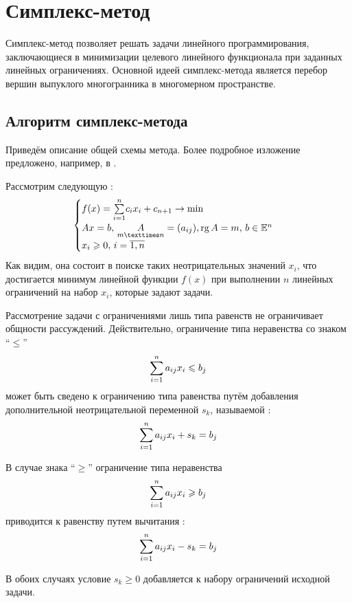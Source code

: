 \section{Симплекс-метод}
\label{sec:simplex}

Симплекс-метод позволяет решать задачи линейного программирования,
заключающиеся в минимизации целевого линейного функционала при
заданных линейных ограничениях. Основной идеей симплекс-метода
является перебор вершин выпуклого многогранника в многомерном
пространстве.

\subsection{Алгоритм симплекс-метода}

Приведём описание общей схемы метода. Более подробное изложение
предложено, например, в \cite{taha05}.

Рассмотрим следующую :
\begin{equation}
  \label{eq:lp-problem-form-initial}
  \begin{cases}
    f(x) = \suml_{i=1}^n{\! c_i x_i} + c_{n+1} \to \min \\
    Ax = b,\, \underset{m×n}{A} = (a_{ij}),\rank{A} = m,\,b \in \set{E}^n \\
    x_i \geq 0,\, i = \overline{1, n}
  \end{cases}
\end{equation}
Как видим, она состоит в поиске таких неотрицательных значений
$x_i$, что достигается минимум линейной функции $f(x)$ при выполнении
$n$ линейных ограничений на набор $x_i$, которые задают
 задачи.

\begin{rem}
  \label{rem:slack}
  Рассмотрение задачи с ограничениями лишь типа равенств не
  ограничивает общности рассуждений. Действительно, ограничение типа
  неравенства со знаком ``$\leq$''
  \begin{equation*}
    \sum\limits_{i=1}^n a_{ij} x_i \leqslant b_j
  \end{equation*}
  может быть сведено к ограничению типа равенства путём добавления
  дополнительной неотрицательной переменной $s_k$, называемой
  :
  \begin{equation*}
    \sum\limits_{i=1}^n a_{ij} x_i + s_k = b_j
  \end{equation*}

  В случае знака ``$\geq$'' ограничение типа неравенства
  \begin{equation*}
    \sum\limits_{i=1}^n a_{ij} x_i \geqslant b_j
  \end{equation*}
  приводится к равенству путем вычитания :
  \begin{equation*}
    \sum\limits_{i=1}^n a_{ij} x_i - s_k = b_j
  \end{equation*}

  В обоих случаях условие $s_k \geq 0$ добавляется к набору
  ограничений исходной задачи.
\end{rem}

